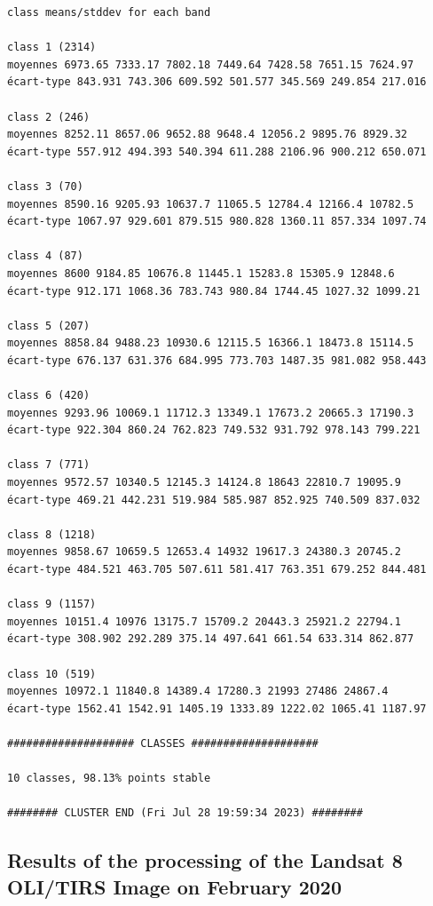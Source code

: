 \documentclass[earth,article,accept,pdftex,moreauthors]{Definitions/mdpi}
\begin{document}
{\begin{scriptsize}
\begin{verbatim}
class means/stddev for each band

class 1 (2314)
moyennes 6973.65 7333.17 7802.18 7449.64 7428.58 7651.15 7624.97
écart-type 843.931 743.306 609.592 501.577 345.569 249.854 217.016

class 2 (246)
moyennes 8252.11 8657.06 9652.88 9648.4 12056.2 9895.76 8929.32
écart-type 557.912 494.393 540.394 611.288 2106.96 900.212 650.071

class 3 (70)
moyennes 8590.16 9205.93 10637.7 11065.5 12784.4 12166.4 10782.5
écart-type 1067.97 929.601 879.515 980.828 1360.11 857.334 1097.74

class 4 (87)
moyennes 8600 9184.85 10676.8 11445.1 15283.8 15305.9 12848.6
écart-type 912.171 1068.36 783.743 980.84 1744.45 1027.32 1099.21

class 5 (207)
moyennes 8858.84 9488.23 10930.6 12115.5 16366.1 18473.8 15114.5
écart-type 676.137 631.376 684.995 773.703 1487.35 981.082 958.443

class 6 (420)
moyennes 9293.96 10069.1 11712.3 13349.1 17673.2 20665.3 17190.3
écart-type 922.304 860.24 762.823 749.532 931.792 978.143 799.221

class 7 (771)
moyennes 9572.57 10340.5 12145.3 14124.8 18643 22810.7 19095.9
écart-type 469.21 442.231 519.984 585.987 852.925 740.509 837.032

class 8 (1218)
moyennes 9858.67 10659.5 12653.4 14932 19617.3 24380.3 20745.2
écart-type 484.521 463.705 507.611 581.417 763.351 679.252 844.481

class 9 (1157)
moyennes 10151.4 10976 13175.7 15709.2 20443.3 25921.2 22794.1
écart-type 308.902 292.289 375.14 497.641 661.54 633.314 862.877

class 10 (519)
moyennes 10972.1 11840.8 14389.4 17280.3 21993 27486 24867.4
écart-type 1562.41 1542.91 1405.19 1333.89 1222.02 1065.41 1187.97

#################### CLASSES ####################

10 classes, 98.13% points stable

######## CLUSTER END (Fri Jul 28 19:59:34 2023) ########

\end{verbatim}
\end{scriptsize}

\subsection[\appendixname~\thesubsection]{Results of the processing of the Landsat 8 OLI/TIRS Image on February 2020}
\begin{scriptsize}
\begin{verbatim}


\end{verbatim}
\end{scriptsize}}
\end{document}
